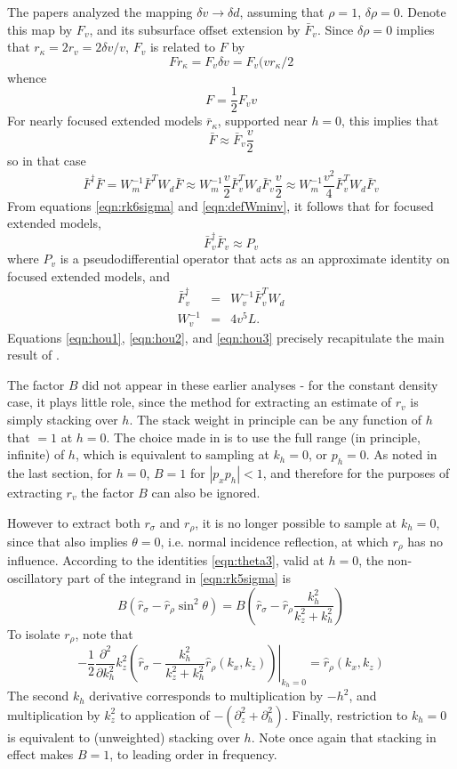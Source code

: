 The papers \cite[]{HouSymes:15,HouSymes:17} analyzed the mapping
$\delta v \rightarrow \delta d$, assuming that $\rho = 1$, $\delta \rho =
0$. Denote this map by $F_v$, and its subsurface offset extension by
$\bar{F}_v$. Since $\delta \rho = 0$ implies that $r_{\kappa} = 2 r_v
= 2 \delta v / v$, $F_v$ is related to $F$ by 
\[
Fr_{\kappa} = F_v \delta v = F_v (v r_{\kappa}/2
\]
whence 
\[ 
F = \frac{1}{2}F_v v
\]
For nearly focused extended models $\bar{r}_{\kappa}$, supported near
$h=0$, this implies that 
\[
\bar{F} \approx \bar{F}_v \frac{v}{2}
\]
so in that case
\begin{equation}
\label{eqn:vkap}
\bar{F}^{\dagger} \bar{F} = W_m^{-1} \bar{F}^T W_d \bar{F}  \approx
W_m^{-1} \frac{v}{2} \bar{F}_v^T W_d \bar{F}_v \frac{v}{2} \approx
W_m^{-1}\frac{v^2}{4} \bar{F}_v^T W_d \bar{F}_v
\end{equation}
From equations \ref{eqn:rk6sigma} and \ref{eqn:defWminv}, it follows
that for focused extended models, 
\begin{equation}
\label{eqn:hou1}
\bar{F}_v^{\dagger} \bar{F}_v \approx P_v
\end{equation}
where $P_v$ is a pseudodifferential operator that acts as an
approximate identity on focused extended models, and 
\begin{eqnarray}
\label{eqn:hou2}
\bar{F}_v^{\dagger} &=& W_v^{-1}\bar{F}_v^TW_d\\
\label{eqn:hou3}
W_v^{-1} &=& 4 v^5 L.
\end{eqnarray}
Equations \ref{eqn:hou1}, \ref{eqn:hou2}, and \ref{eqn:hou3} precisely
recapitulate the main result of \cite{HouSymes:15}.


The factor $B$ did not appear in these earlier analyses - for the constant density
case, it plays little role, since the method for extracting an
estimate of $r_v$ is simply stacking over $h$. The stack weight in
principle can be any function of $h$ that $=1$ at $h=0$. The choice
made in \cite[]{HouSymes:15} is to use the full range (in principle,
infinite) of $h$, which is equivalent to sampling at $k_h=0$, or $p_h=0$.
As noted in the last section, for $h=0$, $B=1$ for $|p_xp_h| < 1$, and
therefore for the purposes of extracting $r_v$ the factor $B$ can also
be ignored.

However to extract both $r_{\sigma}$ and $r_{\rho}$, it is no longer
possible to sample at $k_h=0$, since that also implies $\theta=0$,
i.e. normal incidence reflection, at which $r_{\rho}$ has no influence.
According to the identities \ref{eqn:theta3}, valid at $h=0$, the
non-oscillatory part of the integrand in \ref{eqn:rk5sigma} is
\[
B (\hat{r}_{\sigma} - \hat{r}_{\rho} \sin^2 \theta )
 = B \left(\hat{r}_{\sigma} - \hat{r}_{\rho} \frac{k_h^2}{k_z^2+k_h^2}\right)
\]
To isolate $r_{\rho}$, note that
\[
\left.-\frac{1}{2}\frac{\partial^2}{\partial k_h^2}
  k_z^2\left(\hat{r}_{\sigma} -
  \frac{k_h^2}{k_z^2+k_h^2}\hat{r}_{\rho}(k_x,k_z)\right)\right|_{k_h=0} = \hat{r}_{\rho}(k_x,k_z)
\]
The second $k_h$ derivative corresponds to multiplication by $-h^2$,
and multiplication by $k_z^2$ to application of
$-(\partial_z^2+\partial_h^2)$. Finally, restriction to $k_h=0$ is
equivalent to (unweighted) stacking over $h$. Note once again that
stacking in effect makes $B=1$, to leading order in frequency. 

